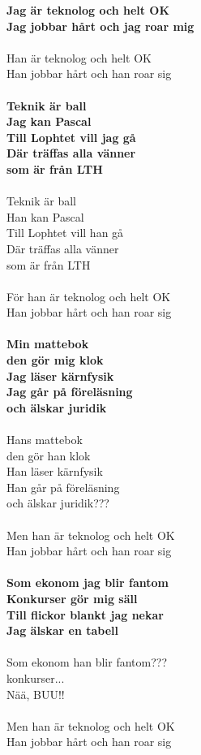 \documentclass{article}
\begin{document}
\noindent\textbf{Jag är teknolog och helt OK\\
Jag jobbar hårt och jag roar mig}\\\\
\noindent Han är teknolog och helt OK\\
Han jobbar hårt och han roar sig\\\\
\noindent\textbf{Teknik är ball\\
Jag kan Pascal\\
Till Lophtet vill jag gå\\
Där träffas alla vänner\\
som är från LTH}\\\\
\noindent Teknik är ball\\
Han kan Pascal\\
Till Lophtet vill han gå\\
Där träffas alla vänner\\
som är från LTH\\\\
\noindent För han är teknolog och helt OK\\
Han jobbar hårt och han roar sig\\\\
\noindent\textbf{Min mattebok \\
den gör mig klok\\
Jag läser kärnfysik\\
Jag går på föreläsning\\
och älskar juridik}\\\\
\noindent Hans mattebok\\
den gör han klok\\
Han läser kärnfysik\\
Han går på föreläsning\\
och älskar juridik???\\\\
\noindent Men han är teknolog och helt OK\\
Han jobbar hårt och han roar sig\\\\
\noindent\textbf{Som ekonom jag blir fantom\\
Konkurser gör mig säll\\
Till flickor blankt jag nekar\\
Jag älskar en tabell}\\\\
\noindent Som ekonom han blir fantom???\\
konkurser...\\
Nää, BUU!!\\\\
\noindent Men han är teknolog och helt OK\\
Han jobbar hårt och han roar sig\\
\end{document}
